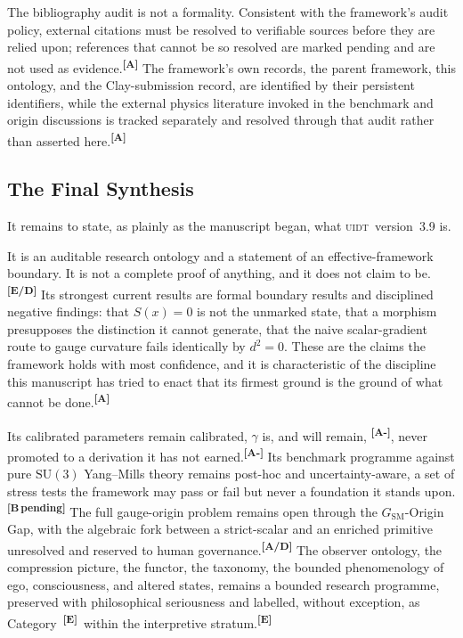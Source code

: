 \documentclass[12pt,a4paper,twoside]{article}
\theoremstyle{plain}
\theoremstyle{definition}
\theoremstyle{remark}
\newcommand{\UIDT}{\textsc{uidt}}
\newcommand{\catmark}[1]{\textsuperscript{\textsf{\textbf{[#1]}}}}
\begin{document}
The bibliography audit is not a formality. Consistent with the framework's audit policy, external citations must be resolved to verifiable sources before they are relied upon; references that cannot be so resolved are marked pending and are not used as evidence.\catmark{A} The framework's own records, the parent framework, this ontology, and the Clay-submission record, are identified by their persistent identifiers, while the external physics literature invoked in the benchmark and origin discussions is tracked separately and resolved through that audit rather than asserted here.\catmark{A}

\subsection{The Final Synthesis}
\label{subsec:final-paragraph}

It remains to state, as plainly as the manuscript began, what \UIDT\ version~3.9 is.

It is an auditable research ontology and a statement of an effective-framework boundary. It is not a complete proof of anything, and it does not claim to be.\catmark{E/D} Its strongest current results are formal boundary results and disciplined negative findings: that $S(x)=0$ is not the unmarked state, that a morphism presupposes the distinction it cannot generate, that the naive scalar-gradient route to gauge curvature fails identically by $d^2=0$. These are the claims the framework holds with most confidence, and it is characteristic of the discipline this manuscript has tried to enact that its firmest ground is the ground of what cannot be done.\catmark{A}

Its calibrated parameters remain calibrated, $\gamma$ is, and will remain, \catmark{A-}, never promoted to a derivation it has not earned.\catmark{A-} Its benchmark programme against pure $\mathrm{SU}(3)$ Yang--Mills theory remains post-hoc and uncertainty-aware, a set of stress tests the framework may pass or fail but never a foundation it stands upon.\catmark{B\,pending} The full gauge-origin problem remains open through the $G_{\mathrm{SM}}$-Origin Gap, with the algebraic fork between a strict-scalar and an enriched primitive unresolved and reserved to human governance.\catmark{A/D} The observer ontology, the compression picture, the functor, the taxonomy, the bounded phenomenology of ego, consciousness, and altered states, remains a bounded research programme, preserved with philosophical seriousness and labelled, without exception, as Category~\catmark{E}\ within the interpretive stratum.\catmark{E}
\end{document}
